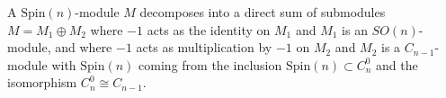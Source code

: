 A $\text{Spin}(n)$-module $M$ decomposes into a direct sum of submodules $M = M_1 \oplus M_2$ where $-1$ acts as the identity on $M_1$ and $M_1$ is an $SO(n)$-module, and where $-1$ acts as multiplication by $-1$ on $M_2$ and $M_2$ is a $C_{n-1}$-module with $\text{Spin}(n)$ coming from the inclusion $\text{Spin}(n) \subset C_n^0$ and the isomorphism $C_n^0 \cong C_{n-1}$.
